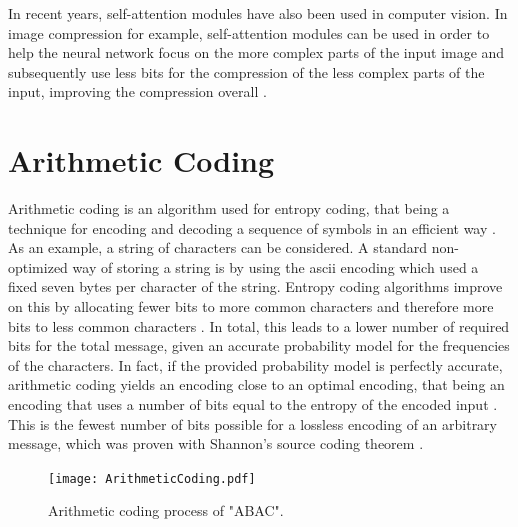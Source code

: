 In recent years, self-attention modules have also been used in computer vision. In image compression for example, self-attention modules can be used in order to help the neural network focus on the more complex parts of the input image and subsequently use less bits for the compression of the less complex parts of the input, improving the compression overall \citep{cheng_learned_2020, liu_non-local_2019}. 

\section{Arithmetic Coding}
\label{sec:arithmetic}
Arithmetic coding is an algorithm used for entropy coding, that being a technique for encoding and decoding a sequence of symbols in an efficient way \citep{witten_arithmetic_1987}. As an example, a string of characters can be considered. A standard non-optimized way of storing a string is by using the \ac{ascii} encoding which used a fixed seven bytes per character of the string. Entropy coding algorithms improve on this by allocating fewer bits to more common characters and therefore more bits to less common characters \citep{witten_arithmetic_1987}. In total, this leads to a lower number of required bits for the total message, given an accurate probability model for the frequencies of the characters. In fact, if the provided probability model is perfectly accurate, arithmetic coding yields an encoding close to an optimal encoding, that being an encoding that uses a number of bits equal to the entropy of the encoded input \citep{witten_arithmetic_1987}. This is the fewest number of bits possible for a lossless encoding of an arbitrary message, which was proven with Shannon's source coding theorem \citep{shannon_mathematical_1948,mackay_information_2003}.

\begin{figure}
\centering
\texttt{[image: ArithmeticCoding.pdf]}
\caption{Arithmetic coding process of "ABAC".}
\label{fig:arithmetic}
\end{figure}

